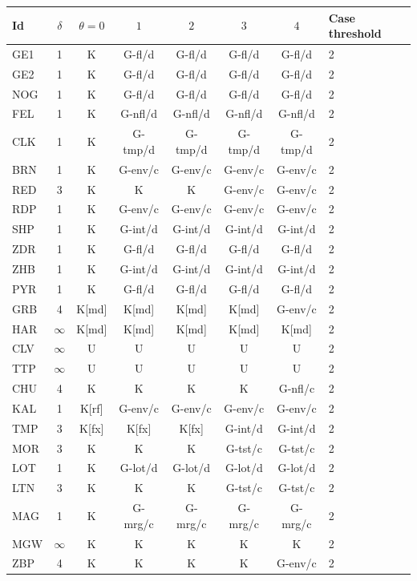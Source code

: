 {\small\setlength{\tabcolsep}{4pt}
\begin{longtable}{@{}lccccccl@{}}
\toprule
Id & $\delta$ & $\theta=0$ & $1$ & $2$ & $3$ & $4$ & Case threshold \\
\midrule\endhead
\bottomrule\endfoot
GE1 & 1 & K & G-fl/d & G-fl/d & G-fl/d & G-fl/d & 2 \\
GE2 & 1 & K & G-fl/d & G-fl/d & G-fl/d & G-fl/d & 2 \\
NOG & 1 & K & G-fl/d & G-fl/d & G-fl/d & G-fl/d & 2 \\
FEL & 1 & K & G-nfl/d & G-nfl/d & G-nfl/d & G-nfl/d & 2 \\
CLK & 1 & K & G-tmp/d & G-tmp/d & G-tmp/d & G-tmp/d & 2 \\
BRN & 1 & K & G-env/c & G-env/c & G-env/c & G-env/c & 2 \\
RED & 3 & K & K & K & G-env/c & G-env/c & 2 \\
RDP & 1 & K & G-env/c & G-env/c & G-env/c & G-env/c & 2 \\
SHP & 1 & K & G-int/d & G-int/d & G-int/d & G-int/d & 2 \\
ZDR & 1 & K & G-fl/d & G-fl/d & G-fl/d & G-fl/d & 2 \\
ZHB & 1 & K & G-int/d & G-int/d & G-int/d & G-int/d & 2 \\
PYR & 1 & K & G-fl/d & G-fl/d & G-fl/d & G-fl/d & 2 \\
GRB & 4 & K[md] & K[md] & K[md] & K[md] & G-env/c & 2 \\
HAR & $\infty$ & K[md] & K[md] & K[md] & K[md] & K[md] & 2 \\
CLV & $\infty$ & U & U & U & U & U & 2 \\
TTP & $\infty$ & U & U & U & U & U & 2 \\
CHU & 4 & K & K & K & K & G-nfl/c & 2 \\
KAL & 1 & K[rf] & G-env/c & G-env/c & G-env/c & G-env/c & 2 \\
TMP & 3 & K[fx] & K[fx] & K[fx] & G-int/d & G-int/d & 2 \\
MOR & 3 & K & K & K & G-tst/c & G-tst/c & 2 \\
LOT & 1 & K & G-lot/d & G-lot/d & G-lot/d & G-lot/d & 2 \\
LTN & 3 & K & K & K & G-tst/c & G-tst/c & 2 \\
MAG & 1 & K & G-mrg/c & G-mrg/c & G-mrg/c & G-mrg/c & 2 \\
MGW & $\infty$ & K & K & K & K & K & 2 \\
ZBP & 4 & K & K & K & K & G-env/c & 2 \\

\end{longtable}}
